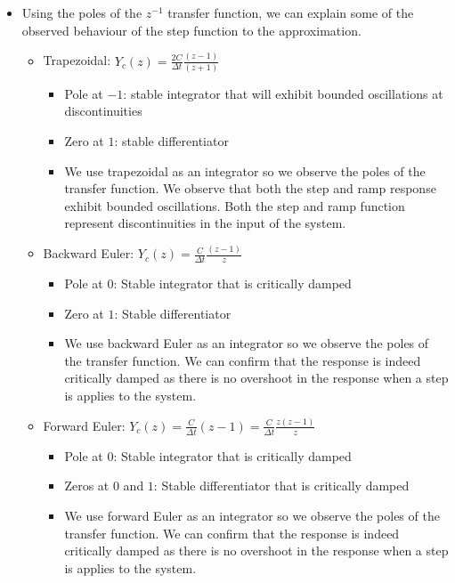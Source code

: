 \documentclass[10pt, oneside, letterpaper]{article}
\begin{document}
\begin{itemize}
    \item Using the poles of the $z^{-1}$ transfer function, we can explain some of the observed behaviour of the step function to the approximation.
    \begin{itemize}
      \item Trapezoidal: $Y_c(z) = \frac{2C}{\Delta{}t}\frac{(z - 1)}{(z + 1)}$
        \begin{itemize}
          \item Pole at $-1$: stable integrator that will exhibit bounded oscillations at discontinuities
          \item Zero at $1$: stable differentiator
          \item We use trapezoidal as an integrator so we observe the poles of the transfer function. We observe that both the step and ramp response exhibit bounded oscillations. Both the step and ramp function represent discontinuities in the input of the system.
        \end{itemize}
      \item Backward Euler: $Y_c(z) = \frac{C}{\Delta{}t}\frac{(z - 1)}{z}$
        \begin{itemize}
          \item Pole at $0$: Stable integrator that is critically damped
          \item Zero at $1$: Stable differentiator
          \item We use backward Euler as an integrator so we observe the poles of the transfer function. We can confirm that the response is indeed critically damped as there is no overshoot in the response when a step is applies to the system.
        \end{itemize}
      \item Forward Euler: $Y_c(z) = \frac{C}{\Delta{}t}(z - 1) = \frac{C}{\Delta{}t}\frac{z(z - 1)}{z}$
        \begin{itemize}
          \item Pole at $0$: Stable integrator that is critically damped
          \item Zeros at $0$ and $1$: Stable differentiator that is critically damped
          \item We use forward Euler as an integrator so we observe the poles of the transfer function. We can confirm that the response is indeed critically damped as there is no overshoot in the response when a step is applies to the system.
        \end{itemize}

\end{itemize}
\end{itemize}
\end{document}
